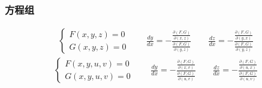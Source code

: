 \subsubsection{方程组}
\begin{align}
	\begin{cases}
		F(x,y,z)=0\\
		G(x,y,z)=0
	\end{cases}\qquad
	\frac{dy}{dx}=-\frac{\frac{\partial(F,G)}{\partial(x,z)}}{\frac{\partial(F,G)}{\partial(y,z)}}\qquad
	\frac{dz}{dx}=-\frac{\frac{\partial(F,G)}{\partial(y,x)}}{\frac{\partial(F,G)}{\partial(y,z)}}\label{Multivariate_equation_system_1}
\end{align}
\begin{align}
	\begin{cases}
		F(x,y,u,v)=0\\
		G(x,y,u,v)=0
	\end{cases}\qquad
	\frac{dy}{dx}=-\frac{\frac{\partial(F,G)}{\partial(x,v)}}{\frac{\partial(F,G)}{\partial(u,v)}}\qquad
	\frac{dz}{dx}=-\frac{\frac{\partial(F,G)}{\partial(u,x)}}{\frac{\partial(F,G)}{\partial(u,v)}}\label{Multivariate_equation_system_2}
\end{align}














